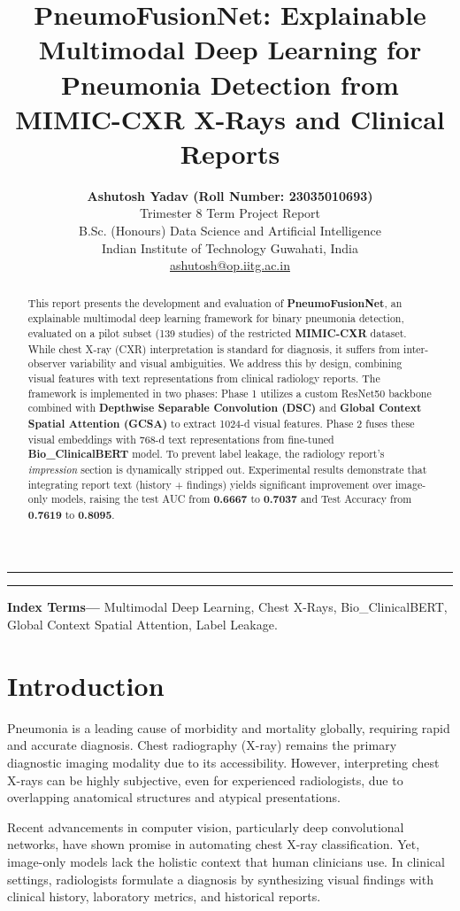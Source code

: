 \documentclass[11pt,a4paper]{article}
\title{\textbf{PneumoFusionNet: Explainable Multimodal Deep Learning for Pneumonia Detection from MIMIC-CXR X-Rays and Clinical Reports}}
\author{
    \textbf{Ashutosh Yadav (Roll Number: 23035010693)} \\
    \small Trimester 8 Term Project Report \\
    \small B.Sc. (Honours) Data Science and Artificial Intelligence \\
    \small Indian Institute of Technology Guwahati, India \\
    \small \href{mailto:ashutosh@op.iitg.ac.in}{ashutosh@op.iitg.ac.in}
}
\date{}
\begin{document}
\maketitle

\hrule
\begin{abstract}
This report presents the development and evaluation of \textbf{PneumoFusionNet}, an explainable multimodal deep learning framework for binary pneumonia detection, evaluated on a pilot subset (139 studies) of the restricted \textbf{MIMIC-CXR} dataset. While chest X-ray (CXR) interpretation is standard for diagnosis, it suffers from inter-observer variability and visual ambiguities. We address this by design, combining visual features with text representations from clinical radiology reports. The framework is implemented in two phases: Phase 1 utilizes a custom ResNet50 backbone combined with \textbf{Depthwise Separable Convolution (DSC)} and \textbf{Global Context Spatial Attention (GCSA)} to extract 1024-d visual features. Phase 2 fuses these visual embeddings with 768-d text representations from fine-tuned \textbf{Bio\_ClinicalBERT} model. To prevent label leakage, the radiology report's \textit{impression} section is dynamically stripped out. Experimental results demonstrate that integrating report text (history + findings) yields significant improvement over image-only models, raising the test AUC from \textbf{0.6667} to \textbf{0.7037} and Test Accuracy from \textbf{0.7619} to \textbf{0.8095}.
\end{abstract}
\hrule

\vspace{0.5cm}
\noindent \textbf{Index Terms---} Multimodal Deep Learning, Chest X-Rays, Bio\_ClinicalBERT, Global Context Spatial Attention, Label Leakage.

\section{Introduction}
Pneumonia is a leading cause of morbidity and mortality globally, requiring rapid and accurate diagnosis. Chest radiography (X-ray) remains the primary diagnostic imaging modality due to its accessibility. However, interpreting chest X-rays can be highly subjective, even for experienced radiologists, due to overlapping anatomical structures and atypical presentations. 

Recent advancements in computer vision, particularly deep convolutional networks, have shown promise in automating chest X-ray classification. Yet, image-only models lack the holistic context that human clinicians use. In clinical settings, radiologists formulate a diagnosis by synthesizing visual findings with clinical history, laboratory metrics, and historical reports. 
\end{document}
